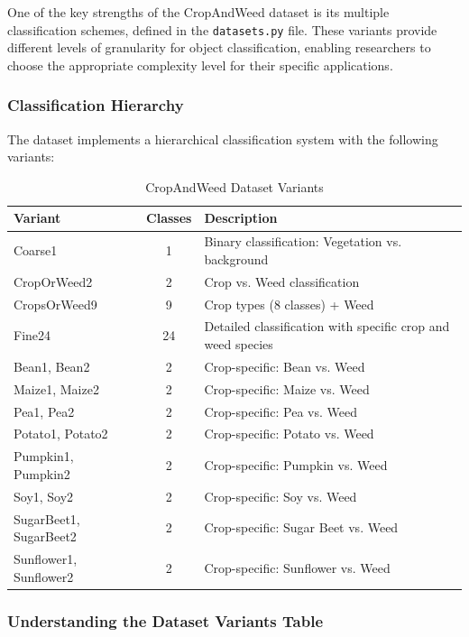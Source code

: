 One of the key strengths of the CropAndWeed dataset is its multiple classification schemes, defined in the \texttt{datasets.py} file. These variants provide different levels of granularity for object classification, enabling researchers to choose the appropriate complexity level for their specific applications.

\subsubsection{Classification Hierarchy}

The dataset implements a hierarchical classification system with the following variants:

\begin{table}[H]
\centering
\caption{CropAndWeed Dataset Variants}
\label{tab:dataset_variants}
\begin{tabular}{@{}lcp{8cm}@{}}
\toprule
\textbf{Variant} & \textbf{Classes} & \textbf{Description} \\
\midrule
Coarse1 & 1 & Binary classification: Vegetation vs. background \\
CropOrWeed2 & 2 & Crop vs. Weed classification \\
CropsOrWeed9 & 9 & Crop types (8 classes) + Weed \\
Fine24 & 24 & Detailed classification with specific crop and weed species \\
\midrule
Bean1, Bean2 & 2 & Crop-specific: Bean vs. Weed \\
Maize1, Maize2 & 2 & Crop-specific: Maize vs. Weed \\
Pea1, Pea2 & 2 & Crop-specific: Pea vs. Weed \\
Potato1, Potato2 & 2 & Crop-specific: Potato vs. Weed \\
Pumpkin1, Pumpkin2 & 2 & Crop-specific: Pumpkin vs. Weed \\
Soy1, Soy2 & 2 & Crop-specific: Soy vs. Weed \\
SugarBeet1, SugarBeet2 & 2 & Crop-specific: Sugar Beet vs. Weed \\
Sunflower1, Sunflower2 & 2 & Crop-specific: Sunflower vs. Weed \\
\bottomrule
\end{tabular}
\end{table}

\subsubsection{Understanding the Dataset Variants Table}

